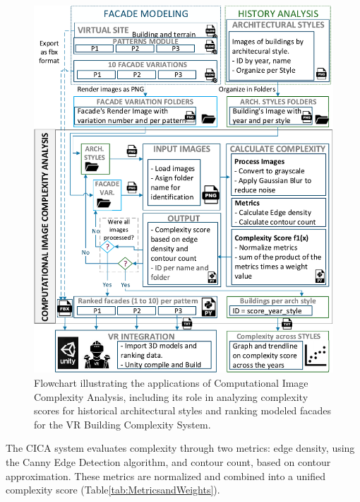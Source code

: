     \begin{figure}[!htb]
      \centering
      \includegraphics[width= \linewidth, trim=0 0 0 0, clip]{Images/ImageComplexityAnalysisFlowchart}
      \caption{Flowchart illustrating the applications of Computational Image Complexity Analysis, including its role in analyzing complexity scores for historical architectural styles and ranking modeled facades for the VR Building Complexity System.}
      \label{fig:ImageComplexityAnalysisFlowchart}
    \end{figure}

The CICA system evaluates complexity through two metrics: edge density, using the Canny Edge Detection algorithm\cite{EdgeOpenCV2023}, and contour count, based on contour approximation\cite{ContourOpenCV2023}.
These metrics are normalized and combined into a unified complexity score (Table\ref{tab:MetricsandWeights}).

